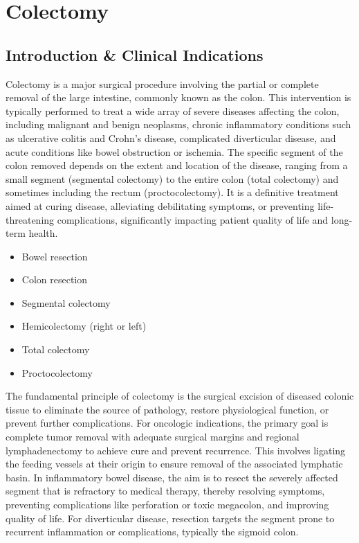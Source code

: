 \chapter{Colectomy}

\section*{Introduction \& Clinical Indications}
Colectomy is a major surgical procedure involving the partial or complete removal of the large intestine, commonly known as the colon. This intervention is typically performed to treat a wide array of severe diseases affecting the colon, including malignant and benign neoplasms, chronic inflammatory conditions such as ulcerative colitis and Crohn's disease, complicated diverticular disease, and acute conditions like bowel obstruction or ischemia. The specific segment of the colon removed depends on the extent and location of the disease, ranging from a small segment (segmental colectomy) to the entire colon (total colectomy) and sometimes including the rectum (proctocolectomy). It is a definitive treatment aimed at curing disease, alleviating debilitating symptoms, or preventing life-threatening complications, significantly impacting patient quality of life and long-term health.

\begin{itemize}
  \item Bowel resection
  \item Colon resection
  \item Segmental colectomy
  \item Hemicolectomy (right or left)
  \item Total colectomy
  \item Proctocolectomy
\end{itemize}

The fundamental principle of colectomy is the surgical excision of diseased colonic tissue to eliminate the source of pathology, restore physiological function, or prevent further complications. For oncologic indications, the primary goal is complete tumor removal with adequate surgical margins and regional lymphadenectomy to achieve cure and prevent recurrence. This involves ligating the feeding vessels at their origin to ensure removal of the associated lymphatic basin. In inflammatory bowel disease, the aim is to resect the severely affected segment that is refractory to medical therapy, thereby resolving symptoms, preventing complications like perforation or toxic megacolon, and improving quality of life. For diverticular disease, resection targets the segment prone to recurrent inflammation or complications, typically the sigmoid colon.

